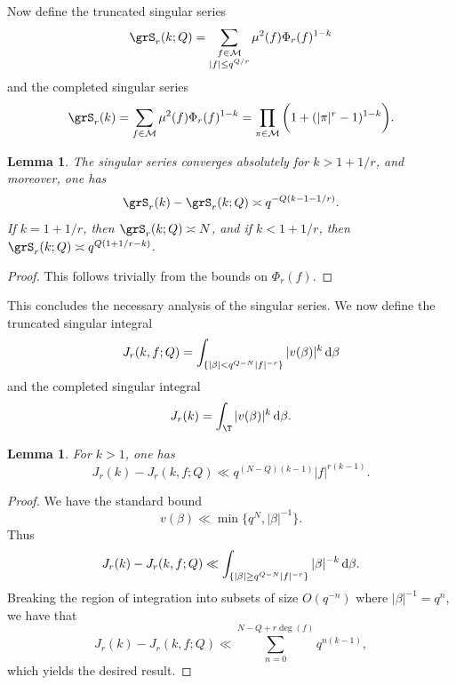 \documentclass[reqno,11pt]{amsart}
\newtheorem{lemma}[theorem]{Lemma}
\theoremstyle{definition}
\theoremstyle{remark}
\numberwithin{equation}{section}
\def\calM{{\mathcal M}}
\renewcommand{\d}{\,{\rm d}} %
\newcommand{\<}{\begin{equation}}
\renewcommand{\>}{\end{equation}}
\begin{document}
Now define the truncated singular series
\[\grS_r(k;Q) = \sum_{\substack{f \in \calM \\ |f| \leq q^{Q/r}}} \mu^2(f)\Phi_r(f)^{1-k}\]
and the completed singular series
\[\grS_r(k) = \sum_{f \in \calM} \mu^2(f)\Phi_r(f)^{1-k} = \prod_{\pi \in \calM} \bigg(1+(|\pi|^r - 1)^{1-k}\bigg).\]
\begin{lemma}\label{sing-ser-conv}
    The singular series converges absolutely for $k>1+1/r$, and moreover, one has
    \[\grS_r(k) - \grS_r(k;Q) \asymp q^{-Q(k-1-1/r)}.\]
    If $k = 1+1/r$, then $\grS_r(k;Q) \asymp N$, and if $k<1+1/r$, then $\grS_r(k;Q) \asymp q^{Q(1+1/r-k)}$.
\end{lemma}
\begin{proof}
    This follows trivially from the bounds on $\Phi_r(f)$.
\end{proof}
This concludes the necessary analysis of the singular series. We now define the truncated singular integral
\[J_r(k,f;Q) = \int_{\{|\beta| < q^{Q-N}|f|^{-r}\}} |v(\beta)|^k \d\beta\]
and the completed singular integral
\[J_r(k) = \int_{\T} |v(\beta)|^k \d\beta.\]
\begin{lemma}\label{sing-int-conv}
    For $k>1$, one has
    \[J_r(k) - J_r(k,f;Q) \ll q^{(N-Q)(k-1)}|f|^{r(k-1)} .\]
\end{lemma}
\begin{proof}
    We have the standard bound
    \[v(\beta) \ll \min\{q^N,|\beta|^{-1}\}.\]
    Thus 
    \[J_r(k)-J_r(k,f;Q) \ll \int_{\{|\beta| \geq q^{Q-N}|f|^{-r}\}}|\beta|^{-k} \d\beta.\]
    Breaking the region of integration into subsets of size $O(q^{-n})$ where $|\beta|^{-1} = q^n$, we have that 
    \[J_r(k) - J_r(k,f;Q) \ll \sum_{n = 0}^{N-Q+r\deg(f)} q^{n(k-1)},\]
    which yields the desired result.
\end{proof}
\end{document}
